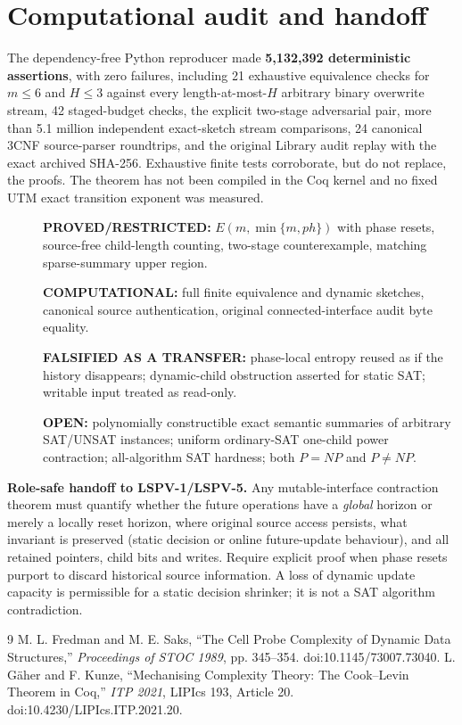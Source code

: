 \documentclass[11pt]{article}
\begin{document}
\section{Computational audit and handoff}
The dependency-free Python reproducer made \textbf{5,132,392 deterministic assertions}, with zero failures, including 21 exhaustive equivalence checks for $m\le6$ and $H\le3$ against every length-at-most-$H$ arbitrary binary overwrite stream, 42 staged-budget checks, the explicit two-stage adversarial pair, more than 5.1 million independent exact-sketch stream comparisons, 24 canonical 3CNF source-parser roundtrips, and the original Library audit replay with the exact archived SHA-256. Exhaustive finite tests corroborate, but do not replace, the proofs. The theorem has not been compiled in the Coq kernel and no fixed UTM exact transition exponent was measured.

\begin{description}
\item[]\textbf{PROVED/RESTRICTED:} $E(m,\min\{m,ph\})$ with phase resets, source-free child-length counting, two-stage counterexample, matching sparse-summary upper region.
\item[]\textbf{COMPUTATIONAL:} full finite equivalence and dynamic sketches, canonical source authentication, original connected-interface audit byte equality.
\item[]\textbf{FALSIFIED AS A TRANSFER:} phase-local entropy reused as if the history disappears; dynamic-child obstruction asserted for static SAT; writable input treated as read-only.
\item[]\textbf{OPEN:} polynomially constructible exact semantic summaries of arbitrary SAT/UNSAT instances; uniform ordinary-SAT one-child power contraction; all-algorithm SAT hardness; both $P=NP$ and $P\ne NP$.
\end{description}
\noindent\textbf{Role-safe handoff to LSPV-1/LSPV-5.} Any mutable-interface contraction theorem must quantify whether the future operations have a \emph{global} horizon or merely a locally reset horizon, where original source access persists, what invariant is preserved (static decision or online future-update behaviour), and all retained pointers, child bits and writes. Require explicit proof when phase resets purport to discard historical source information. A loss of dynamic update capacity is permissible for a static decision shrinker; it is not a SAT algorithm contradiction.

\begin{thebibliography}{9}
 M. L. Fredman and M. E. Saks, ``The Cell Probe Complexity of Dynamic Data Structures,'' \emph{Proceedings of STOC 1989}, pp. 345--354. doi:10.1145/73007.73040.
 L. G\"aher and F. Kunze, ``Mechanising Complexity Theory: The Cook--Levin Theorem in Coq,'' \emph{ITP 2021}, LIPIcs 193, Article 20. doi:10.4230/LIPIcs.ITP.2021.20.
\end{thebibliography}
\end{document}
